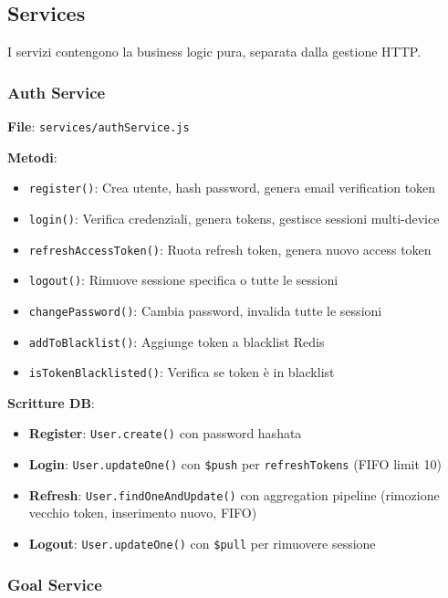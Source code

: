 \documentclass[11pt,a4paper]{article}
\begin{document}
\subsection{Services}

I servizi contengono la business logic pura, separata dalla gestione HTTP.

\subsubsection{Auth Service}

\textbf{File}: \texttt{services/authService.js}

\textbf{Metodi}:
\begin{itemize}
    \item \texttt{register()}: Crea utente, hash password, genera email verification token
    \item \texttt{login()}: Verifica credenziali, genera tokens, gestisce sessioni multi-device
    \item \texttt{refreshAccessToken()}: Ruota refresh token, genera nuovo access token
    \item \texttt{logout()}: Rimuove sessione specifica o tutte le sessioni
    \item \texttt{changePassword()}: Cambia password, invalida tutte le sessioni
    \item \texttt{addToBlacklist()}: Aggiunge token a blacklist Redis
    \item \texttt{isTokenBlacklisted()}: Verifica se token è in blacklist
\end{itemize}

\textbf{Scritture DB}:
\begin{itemize}
    \item \textbf{Register}: \texttt{User.create()} con password hashata
    \item \textbf{Login}: \texttt{User.updateOne()} con \texttt{\$push} per \texttt{refreshTokens} (FIFO limit 10)
    \item \textbf{Refresh}: \texttt{User.findOneAndUpdate()} con aggregation pipeline (rimozione vecchio token, inserimento nuovo, FIFO)
    \item \textbf{Logout}: \texttt{User.updateOne()} con \texttt{\$pull} per rimuovere sessione
\end{itemize}

\subsubsection{Goal Service}
\end{document}
